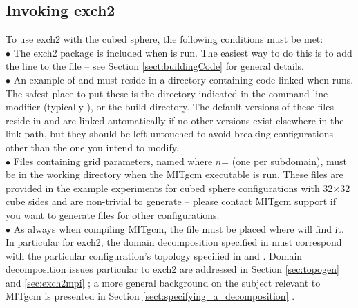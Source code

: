 \subsection{Invoking exch2}

To use exch2 with the cubed sphere, the following conditions must be
met: \\

$\bullet$ The exch2 package is included when  is run.
  The easiest way to do this is to add the line  to the
   file -- see Section
  \ref{sect:buildingCode}  for general
  details. \\

$\bullet$ An example of  and
   must reside in a directory containing code
  linked when  runs.  The safest place to put these
  is the directory indicated in the  command line
  modifier (typically ), or the build directory.  The
  default versions of these files reside in  and are
  linked automatically if no other versions exist elsewhere in the
  link path, but they should be left untouched to avoid breaking
  configurations other than the one you intend to modify.\\

$\bullet$ Files containing grid parameters, named
   where $n$= (one per subdomain),
  must be in the working directory when the MITgcm executable is run.
  These files are provided in the example experiments for cubed sphere
  configurations with 32$\times$32 cube sides and are non-trivial to
  generate -- please contact MITgcm support if you want to generate
  files for other configurations. \\

$\bullet$ As always when compiling MITgcm, the file  must
  be placed where  will find it.  In particular for
  exch2, the domain decomposition specified in  must
  correspond with the particular configuration's topology specified in
   and .  Domain
  decomposition issues particular to exch2 are addressed in Section
  \ref{sec:topogen} 
  and \ref{sec:exch2mpi} ; a more
  general background on the subject relevant to MITgcm is presented in
  Section \ref{sect:specifying_a_decomposition}
  .\\


